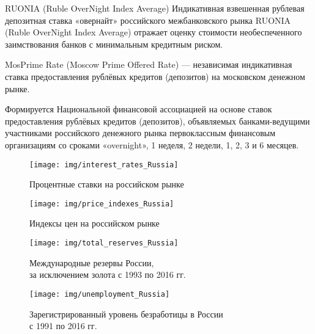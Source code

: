 \documentclass[_DKB_p1_Money.tex]{subfiles}
\begin{document}
\begin{frame}{RUONIA (Ruble OverNight Index Average) }
Индикативная взвешенная рублевая депозитная ставка «овернайт» российского межбанковского рынка RUONIA (Ruble OverNight Index Average) отражает оценку стоимости необеспеченного заимствования банков с минимальным кредитным риском.
\end{frame}

\begin{frame}{MosPrime Rate (Moscow Prime Offered Rate)}
 — независимая индикативная ставка предоставления рублёвых кредитов (депозитов) на московском денежном рынке. 
 
Формируется Национальной финансовой ассоциацией на основе ставок предоставления рублёвых кредитов (депозитов), объявляемых банками-ведущими участниками российского денежного рынка первоклассным финансовым организациям со сроками «overnight», 1 неделя, 2 недели, 1, 2, 3 и 6 месяцев. 
\end{frame}

\begin{frame}[shrink=15]
\begin{figure}
\center
\texttt{[image: img/interest\_rates\_Russia]}
\caption{Процентные ставки на российском рынке}
\end{figure}
\end{frame}

\begin{frame}[shrink=15]
\begin{figure}
\center
\texttt{[image: img/price\_indexes\_Russia]}
\caption{Индексы цен на российском рынке}
\end{figure}
\end{frame}


\begin{frame}[shrink=15]
\begin{figure}
\center
\texttt{[image: img/total\_reserves\_Russia]}
\caption{Международные резервы России,\\ за исключением золота с 1993 по 2016 гг.}
\end{figure}
\end{frame}

\begin{frame}[shrink=15]
\begin{figure}
\center
\texttt{[image: img/unemployment\_Russia]}
\caption{Зарегистрированный уровень безработицы в России\\ с 1991 по 2016 гг.}
\end{figure}
\end{frame}
\end{document}
